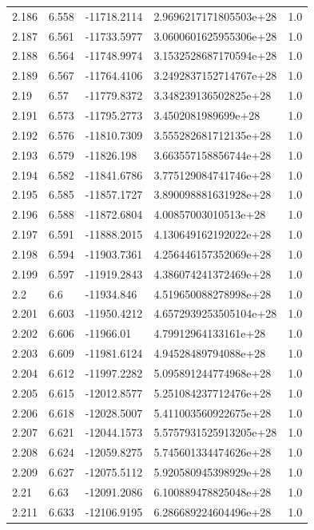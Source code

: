 \begin{tabular}{lllll}
2.186 & 6.558 & -11718.2114 & 2.9696217171805503e+28 & 1.0 \\
2.187 & 6.561 & -11733.5977 & 3.0600601625955306e+28 & 1.0 \\
2.188 & 6.564 & -11748.9974 & 3.1532528687170594e+28 & 1.0 \\
2.189 & 6.567 & -11764.4106 & 3.2492837152714767e+28 & 1.0 \\
2.19 & 6.57 & -11779.8372 & 3.348239136502825e+28 & 1.0 \\
2.191 & 6.573 & -11795.2773 & 3.4502081989699e+28 & 1.0 \\
2.192 & 6.576 & -11810.7309 & 3.555282681712135e+28 & 1.0 \\
2.193 & 6.579 & -11826.198 & 3.663557158856744e+28 & 1.0 \\
2.194 & 6.582 & -11841.6786 & 3.775129084741746e+28 & 1.0 \\
2.195 & 6.585 & -11857.1727 & 3.890098881631928e+28 & 1.0 \\
2.196 & 6.588 & -11872.6804 & 4.00857003010513e+28 & 1.0 \\
2.197 & 6.591 & -11888.2015 & 4.130649162192022e+28 & 1.0 \\
2.198 & 6.594 & -11903.7361 & 4.256446157352069e+28 & 1.0 \\
2.199 & 6.597 & -11919.2843 & 4.386074241372469e+28 & 1.0 \\
2.2 & 6.6 & -11934.846 & 4.519650088278998e+28 & 1.0 \\
2.201 & 6.603 & -11950.4212 & 4.6572939253505104e+28 & 1.0 \\
2.202 & 6.606 & -11966.01 & 4.79912964133161e+28 & 1.0 \\
2.203 & 6.609 & -11981.6124 & 4.94528489794088e+28 & 1.0 \\
2.204 & 6.612 & -11997.2282 & 5.095891244774968e+28 & 1.0 \\
2.205 & 6.615 & -12012.8577 & 5.251084237712476e+28 & 1.0 \\
2.206 & 6.618 & -12028.5007 & 5.411003560922675e+28 & 1.0 \\
2.207 & 6.621 & -12044.1573 & 5.5757931525913205e+28 & 1.0 \\
2.208 & 6.624 & -12059.8275 & 5.745601334474626e+28 & 1.0 \\
2.209 & 6.627 & -12075.5112 & 5.920580945398929e+28 & 1.0 \\
2.21 & 6.63 & -12091.2086 & 6.100889478825048e+28 & 1.0 \\
2.211 & 6.633 & -12106.9195 & 6.286689224604496e+28 & 1.0 \\

\end{tabular}
